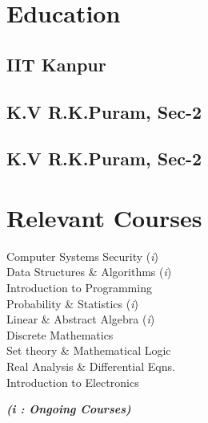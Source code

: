 \documentclass[]{deedy-resume-openfont}
\begin{document}
\begin{minipage}[t]{0.30\textwidth} 

\vspace{-0.5cm}
\section{Education} 

\subsection{IIT Kanpur}
\sectionsep{}

\subsection{K.V R.K.Puram, Sec-2}
\sectionsep{}

\subsection{K.V R.K.Puram, Sec-2}


\section{Relevant Courses}
Computer Systems Security (\textit{i}) \\
Data Structures \& Algorithms (\textit{i}) \\
Introduction to Programming \\
Probability \& Statistics (\textit{i}) \\
Linear \& Abstract Algebra (\textit{i}) \\
Discrete Mathematics \\
Set theory \& Mathematical Logic \\
Real Analysis \& Differential Eqns. \\
Introduction to Electronics

{\footnotesize \textit{\textbf{ (i : Ongoing Courses)}}}



\end{minipage}
\end{document}
